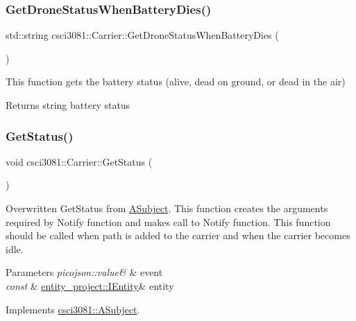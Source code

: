 \subsubsection{\texorpdfstring{Get\+Drone\+Status\+When\+Battery\+Dies()}{GetDroneStatusWhenBatteryDies()}}
{\footnotesize\ttfamily std\+::string csci3081\+::\+Carrier\+::\+Get\+Drone\+Status\+When\+Battery\+Dies (\begin{DoxyParamCaption}{ }\end{DoxyParamCaption})}



This function gets the battery status (alive, dead on ground, or dead in the air) 

\begin{DoxyReturn}{Returns}
string battery status 
\end{DoxyReturn}
\mbox{\label{classcsci3081_1_1Carrier_a2b96f30454fee0766a5ed3a26fbf092c}} 
\subsubsection{\texorpdfstring{Get\+Status()}{GetStatus()}}
{\footnotesize\ttfamily void csci3081\+::\+Carrier\+::\+Get\+Status (\begin{DoxyParamCaption}{ }\end{DoxyParamCaption})\hspace{0.3cm}{\ttfamily [virtual]}}



Overwritten Get\+Status from \hyperlink{classcsci3081_1_1ASubject}{A\+Subject}. This function creates the arguments required by Notify function and makes call to Notify function. This function should be called when path is added to the carrier and when the carrier becomes idle. 


\begin{DoxyParams}{Parameters}
{\em picojson\+::value\&} & event \\
\hline
{\em const} & \hyperlink{classentity__project_1_1IEntity}{entity\+\_\+project\+::\+I\+Entity}\& entity \\
\hline
\end{DoxyParams}


Implements \hyperlink{classcsci3081_1_1ASubject_a206a9ddb559da279011e2f9ea29663dc}{csci3081\+::\+A\+Subject}.

